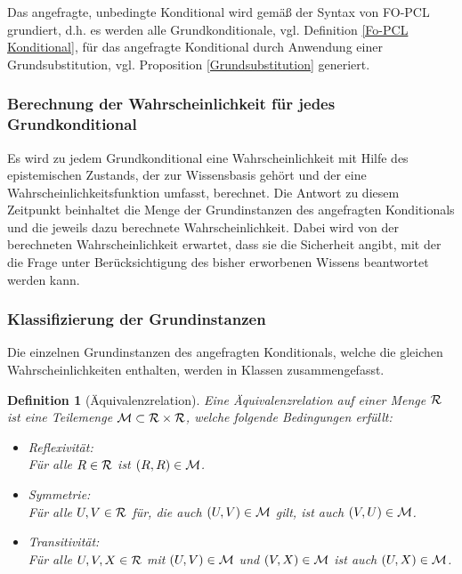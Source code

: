 \documentclass[a4paper, 11pt]{book}
\newtheorem{Def}{Definition }[section]
\begin{document}
Das angefragte, unbedingte Konditional wird gemäß der Syntax von FO-PCL grundiert, d.h. es werden alle Grundkonditionale, vgl. Definition \ref{Fo-PCL Konditional}, für das angefragte Konditional durch Anwendung einer Grundsubstitution, vgl. Proposition \ref{Grundsubstitution} generiert.

\subsubsection{Berechnung der Wahrscheinlichkeit für jedes Grundkonditional}
Es wird zu jedem Grundkonditional eine Wahrscheinlichkeit mit Hilfe des epistemischen Zustands, der zur Wissensbasis gehört und der eine Wahrscheinlichkeitsfunktion umfasst, berechnet. Die Antwort zu diesem Zeitpunkt beinhaltet die Menge der Grundinstanzen des angefragten Konditionals und die jeweils dazu berechnete Wahrscheinlichkeit. Dabei wird von der berechneten Wahrscheinlichkeit erwartet, dass sie die Sicherheit angibt, mit der die Frage unter Berücksichtigung des bisher erworbenen Wissens beantwortet werden kann.
	
\subsubsection{Klassifizierung der Grundinstanzen} 
Die einzelnen Grundinstanzen des angefragten Konditionals, welche die gleichen Wahrscheinlichkeiten enthalten, werden in Klassen zusammengefasst.

\begin{Def}[Äquivalenzrelation] \label{Äquivalenzrelation}
Eine Äquivalenzrelation auf einer Menge $ \cal{R} $  ist eine Teilemenge $ \cal{M} \subset \cal{R} \times \cal{R}$, welche folgende Bedingungen erfüllt:\\
\begin{itemize}
	\item Reflexivität:\\
	 Für alle $ R \in \cal{R} $ ist $ (R,R) \in \cal{M} $.
	\item Symmetrie: \\
	Für alle $ U,V \in \cal{R} $ für, die auch  $ (U,V) \in \cal{M} $ gilt, ist auch  $ (V,U) \in \cal{M} $.
	\item  Transitivität:\\
	Für alle $ U,V,X  \in \cal{R} $ mit $ (U,V) \in \cal{M} $ und $ (V,X) \in \cal{M} $ ist auch $ (U,X) \in \cal{M} $.
\end{itemize}
\end{Def}
\end{document}
